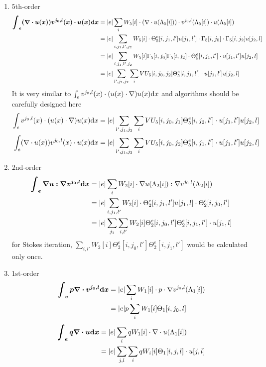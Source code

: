 \begin{enumerate}
  \item $5$th-order
    \[
      \begin{split}
        \bm{\int_e(\nabla\cdot u(x))v^{j_0,l}(x)\cdot u(x)\mathrm{d} x}
        &= |e|\sum_i W_5[i]\cdot (\nabla\cdot u(\Lambda_5[i]))\cdot 
        v^{j_0,l}(\Lambda_5[i]) \cdot u(\Lambda_5[i]) \\
        &= |e|\sum_{i,j_1,l',j_2} W_5[i]\cdot \Theta_5^e[i,j_1,l'] u[j_1,l'] 
        \cdot \Gamma_5[i,j_0] \cdot \Gamma_5[i,j_2]u[j_2,l] \\
        &= |e|\sum_{i,j_1,l',j_2} W_5[i]\Gamma_5[i,j_0]\Gamma_5[i,j_2]
        \cdot\Theta_5^e[i,j_1,l']\cdot u[j_1,l']u[j_2,l] \\
        &= |e|\sum_{l',j_1,j_2}\sum_i VU_5[i,j_0,j_2]\Theta_5^e[i,j_1,l']
        \cdot u[j_1,l']u[j_2,l] 
      \end{split}
    \]
    It is very similar to $\int_{e}v^{j_0,l}(x)\cdot(u(x)\cdot\nabla)u(x)\mathrm{d} x$ and algorithms should be carefully designed here
    \[
      \begin{split}
        \int_e v^{j_0,l}(x)\cdot(u(x)\cdot\nabla)u(x)\mathrm{d} x
        &= |e|\sum_{l',j_1,j_2}\sum_iVU_5[i,j_0,j_1]\Theta_5^e[i,j_2,l']\cdot 
        u[j_1,l']u[j_2,l] \\
        \int_e(\nabla\cdot u(x))v^{j_0,l}(x)\cdot u(x)\mathrm{d} x
        &= |e|\sum_{l',j_1,j_2}\sum_i VU_5[i,j_0,j_2]\Theta_5^e[i,j_1,l']
        \cdot u[j_1,l']u[j_2,l] 
      \end{split}
    \]

  \item $2$nd-order
    \[
      \begin{split}
        \bm{\int_e \nabla u:\nabla v^{j_0,l}\mathrm{d} x} &= |e| \sum_i W_2[i]\cdot 
        \nabla u(\Lambda_2[i]) : \nabla v^{j_0,l}(\Lambda_2[i]) \\
        &= |e| \sum_{i,j_1,l'} W_2[i]\cdot 
        \Theta_2^e[i,j_1,l']u[j_1,l] \cdot \Theta_2^e[i,j_0,l'] \\
        &= |e| \sum_{j_1} \sum_{i,l'}W_2[i]\Theta_2^e[i,j_0,l']\Theta_2^e[i,j_1,l'] 
        \cdot u[j_1,l]
      \end{split}
    \]
    for Stokes iteration, $\sum_{i,l'}W_2[i]\Theta_2^e[i,j_0,l']\Theta_2^e[i,j_1,l']$
    would be calculated only once.

  \item $1$st-order
    \[
      \begin{split}
        \bm{\int_e p\nabla\cdot v^{j_0,l}\mathrm{d} x} &= |e| \sum_i W_1[i]\cdot p\cdot 
        \nabla v^{j_0,l}(\Lambda_1[i]) \\
        &= |e| p\sum_i W_1[i] \Theta_1[i,j_0,l]
      \end{split}
    \]
    \[
      \begin{split}
        \bm{\int_e q\nabla\cdot u\mathrm{d} x} &= |e| \sum_i qW_1[i]\cdot 
        \nabla \cdot u(\Lambda_1[i]) \\
        &= |e| \sum_{j,l}\sum_{i} qW_i[i]\Theta_1[i,j,l]\cdot u[j,l]
      \end{split}
    \]
\end{enumerate}

